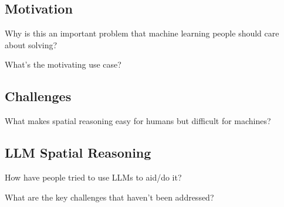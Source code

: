 \subsection{Motivation}
Why is this an important problem that machine learning people should care about solving?

What's the motivating use case?


\subsection{Challenges}
What makes spatial reasoning easy for humans but difficult for machines?


\subsection{LLM Spatial Reasoning}
How have people tried to use LLMs to aid/do it?

What are the key challenges that haven't been addressed?